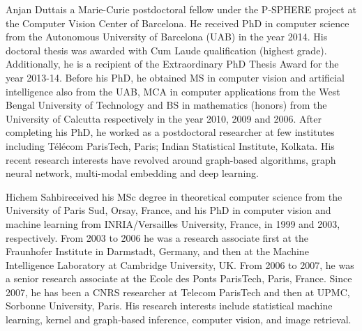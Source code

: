 \documentclass[journal]{IEEEtran}
\theoremstyle{definition}
\begin{document}
{


}
\begin{IEEEbiography}{Anjan Dutta}is a Marie-Curie postdoctoral fellow under the P-SPHERE project at the Computer Vision Center of Barcelona. He received PhD in computer science from the Autonomous University of Barcelona (UAB) in the year 2014. His doctoral thesis was awarded with Cum Laude qualification (highest grade). Additionally, he is a recipient of the Extraordinary PhD Thesis Award for the year 2013-14. Before his PhD, he obtained MS in computer vision and artificial intelligence also from the UAB, MCA in computer applications from the West Bengal University of Technology and BS in mathematics (honors) from the University of Calcutta respectively in the year 2010, 2009 and 2006. After completing his PhD, he worked as a postdoctoral researcher at few institutes including T\'{e}l\'{e}com ParisTech, Paris; Indian Statistical Institute, Kolkata. His recent research interests have revolved around graph-based algorithms, graph neural network, multi-modal embedding and deep learning.
\end{IEEEbiography}
\begin{IEEEbiography}{Hichem Sahbi}received his MSc degree in theoretical computer science from the University of Paris Sud, Orsay, France, and his PhD in computer vision and machine learning from INRIA/Versailles University, France, in 1999 and 2003, respectively. From 2003 to 2006 he was a research associate first at the Fraunhofer Institute in Darmstadt, Germany, and then at the Machine Intelligence Laboratory at Cambridge University, UK. From 2006 to 2007, he was a senior research associate at the Ecole des Ponts ParisTech, Paris, France. Since 2007, he has been a CNRS researcher at Telecom ParisTech and then at UPMC, Sorbonne University, Paris. His research interests include statistical machine learning, kernel and graph-based inference, computer vision, and image retrieval.
\end{IEEEbiography}
\end{document}
